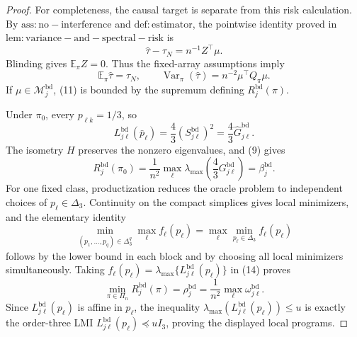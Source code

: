 \documentclass{article}
\begin{document}
\begin{proof}
For completeness, the causal target is separate from this risk calculation.  By \(\mathrm{ass:no-interference}\) and \(\mathrm{def:estimator}\), the pointwise identity proved in \(\mathrm{lem:variance-and-spectral-risk}\) is
\[
\widehat\tau-\tau_N=n^{-1}Z^\top\mu. \tag{10}
\]
Blinding gives \(\mathbb E_\pi Z=0\).  Thus the fixed-array assumptions imply
\[
\mathbb E_\pi\widehat\tau=\tau_N,
\qquad
\operatorname{Var}_\pi(\widehat\tau)=n^{-2}\mu^\top Q_\pi\mu. \tag{11}
\]
If \(\mu\in\mathcal M_j^{\mathrm{bd}}\), (11) is bounded by the supremum defining \(R_j^{\mathrm{bd}}(\pi)\).

Under \(\pi_0\), every \(p_{\ell k}=1/3\), so
\[
L_{j\ell}^{\mathrm{bd}}(\bar p_\ell)
=\frac43(S_{j\ell}^{\mathrm{bd}})^2
=\frac43\widehat G_{j\ell}^{\mathrm{bd}}. \tag{12}
\]
The isometry \(H\) preserves the nonzero eigenvalues, and (9) gives
\[
R_j^{\mathrm{bd}}(\pi_0)
=\frac1{n^2}\max_\ell
\lambda_{\max}\!\left(\frac43G_{j\ell}^{\mathrm{bd}}\right)
=\beta_j^{\mathrm{bd}}. \tag{13}
\]
For one fixed class, productization reduces the oracle problem to independent choices of \(p_\ell\in\Delta_3\).  Continuity on the compact simplices gives local minimizers, and the elementary identity
\[
\min_{(p_1,\ldots,p_q)\in\Delta_3^q}
\max_\ell f_\ell(p_\ell)
=\max_\ell\min_{p_\ell\in\Delta_3}f_\ell(p_\ell) \tag{14}
\]
follows by the lower bound in each block and by choosing all local minimizers simultaneously.  Taking
\(f_\ell(p_\ell)=\lambda_{\max}\{L_{j\ell}^{\mathrm{bd}}(p_\ell)\}\) in (14) proves
\[
\min_{\pi\in\Pi_n}R_j^{\mathrm{bd}}(\pi)
=\rho_j^{\mathrm{bd}}
=\frac1{n^2}\max_\ell\omega_{j\ell}^{\mathrm{bd}}. \tag{15}
\]
Since \(L_{j\ell}^{\mathrm{bd}}(p_\ell)\) is affine in \(p_\ell\), the inequality
\(\lambda_{\max}(L_{j\ell}^{\mathrm{bd}}(p_\ell))\le u\) is exactly the order-three LMI
\(L_{j\ell}^{\mathrm{bd}}(p_\ell)\preceq uI_3\), proving the displayed local programs.


\end{proof}
\end{document}
